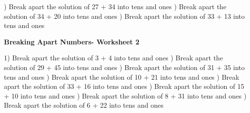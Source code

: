 \documentclass{article}%
\begin{document}
\newline%
) Break apart the solution of 27 + 34 into tens and ones%
\newline%
\newline%
) Break apart the solution of 34 + 20 into tens and ones%
\newline%
\newline%
) Break apart the solution of 33 + 13 into tens and ones%
\newline%
\newline%
\newline%
\pagebreak%
\large%
\begin{center}%
\textbf{Breaking Apart Numbers- Worksheet 2}%
\newline%
\newline%
\newline%
\end{center} \normalsize%
1) Break apart the solution of 3 + 4 into tens and ones%
\newline%
\newline%
) Break apart the solution of 29 + 45 into tens and ones%
\newline%
\newline%
) Break apart the solution of 31 + 35 into tens and ones%
\newline%
\newline%
) Break apart the solution of 10 + 21 into tens and ones%
\newline%
\newline%
) Break apart the solution of 33 + 16 into tens and ones%
\newline%
\newline%
) Break apart the solution of 15 + 10 into tens and ones%
\newline%
\newline%
) Break apart the solution of 8 + 31 into tens and ones%
\newline%
\newline%
) Break apart the solution of 6 + 22 into tens and ones%
\newline%
\end{document}
